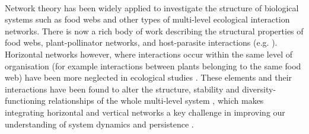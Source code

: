 \documentclass[a4,12pt]{article}
\begin{document}
    \paragraph{}
    Network theory has been widely applied to investigate the structure of biological systems such as food webs and other types of multi-level ecological interaction networks. There is now a rich body of work describing the structural properties of food webs, plant-pollinator networks, and host-parasite interactions (e.g. \cite{Lafferty2008, Thompson2012, Dunne2013, Stouffer2014, Cirtwill2015a}). Horizontal networks however, where interactions occur within the same level of organisation (for example interactions between plants belonging to the same food web) have been more neglected in ecological studies \parencite{Ellison2019}. These elements and their interactions have been found to alter the structure, stability and diversity-functioning relationships of the whole multi-level system \parencite{Hammill2015, Giling2019, Zhao2019, Miele2019}, which makes integrating horizontal and vertical networks a key challenge in improving our understanding of system dynamics and persistence \parencite{Godoy2018c}.

\end{document}
